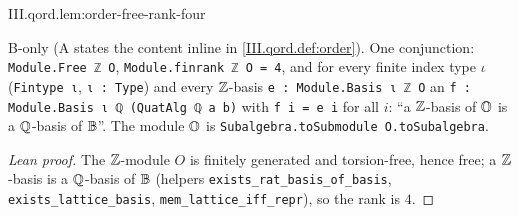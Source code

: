 \begin{lemma}
\bonly
{}
\end{lemma}
\begin{tfformal}{III.qord.lem:order-free-rank-four}
\begin{tffidelity}
B-only (A states the content inline in \cref{III.qord.def:order}). One conjunction: \texttt{Module.Free ℤ O}, \texttt{Module.finrank ℤ O = 4}, and for every finite index type $\iota$ (\texttt{Fintype ι}, \texttt{ι : Type}) and every $\mathbb{Z}$-basis \texttt{e : Module.Basis ι ℤ O} an \texttt{f : Module.Basis ι ℚ (QuatAlg ℚ a b)} with \texttt{f i = e i} for all $i$: ``a $\mathbb{Z}$-basis of $\mathbb{O}$ is a $\mathbb{Q}$-basis of $\mathbb{B}$''. The module $\mathbb{O}$ is \texttt{Subalgebra.toSubmodule O.toSubalgebra}.
\end{tffidelity}
\end{tfformal}
\begin{proof}[Lean proof]
The $\mathbb{Z}$-module $O$ is finitely generated and torsion-free, hence free; a $\mathbb{Z}$-basis is a $\mathbb{Q}$-basis of $\mathbb{B}$ (helpers \texttt{exists\_rat\_basis\_of\_basis}, \texttt{exists\_lattice\_basis}, \texttt{mem\_lattice\_iff\_repr}), so the rank is $4$.
\end{proof}

